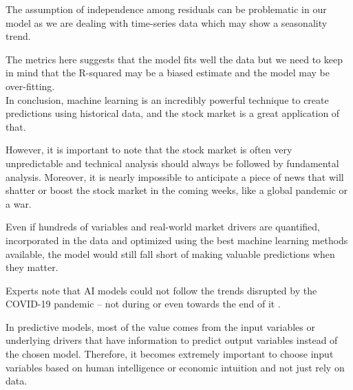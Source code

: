 \documentclass[conference,compsoc]{IEEEtran}
\begin{document}
The assumption of independence among residuals can be problematic in our model as we are dealing with time-series data which may show a seasonality trend.

The metrics here suggests that the model fits well the data but we need to keep in mind that the R-squared may be a biased estimate and the model may be over-fitting. \\

In conclusion, machine learning is an incredibly powerful technique to create predictions using historical data, and the stock market is a great application of that. 

However, it is important to note that the stock market is often very unpredictable and technical analysis should always be followed by fundamental analysis.
%
Moreover, it is nearly impossible to anticipate a piece of news that will shatter or boost the stock market in the coming weeks, like a global pandemic or a war.

Even if hundreds of variables and real-world market drivers are quantified, incorporated in the data and optimized using the best machine learning methods available, the model would still fall short of making valuable predictions when they matter.

Experts note that AI models could not follow the trends disrupted by the COVID-19 pandemic – not during or even towards the end of it \citep{forbes}.

In predictive models, most of the value comes from the input variables or underlying drivers that have information to predict output variables instead of the chosen model. 
%
Therefore, it becomes extremely important to choose input variables based on human intelligence or economic intuition and not just rely on data.



\end{document}
